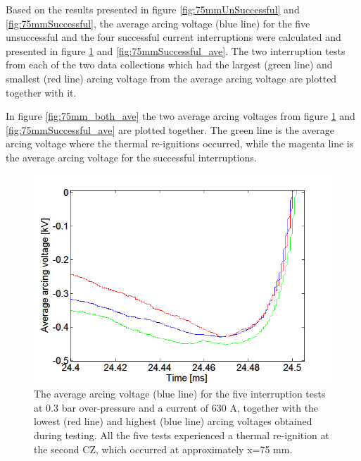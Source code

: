 \documentclass[10pt,b5paper,twoside]{article}
\begin{document}
Based on the results presented in figure \ref{fig:75mmUnSuccessful} and \ref{fig:75mmSuccessful}, the average arcing voltage (blue line) for the five unsuccessful and the four successful current interruptions were calculated and presented in figure \ref{fig:75mmUnSuccessful_ave} and \ref{fig:75mmSuccessful_ave}. The two interruption tests from each of the two data collections which had the largest (green line) and smallest (red line) arcing voltage from the average arcing voltage are plotted together with it.

In figure \ref{fig:75mm_both_ave} the two average arcing voltages from figure \ref{fig:75mmUnSuccessful_ave} and \ref{fig:75mmSuccessful_ave} are plotted together. The green line is the average arcing voltage where the thermal re-ignitions occurred, while the magenta line is the average arcing voltage for the successful interruptions.

\begin{figure}[H]
\centering
\includegraphics[scale=0.6, angle =0 ]{Bilder/Results/ArcingVoltage_75_reIgnition_average.PNG}
\caption{The average arcing voltage (blue line) for the five interruption tests at 0.3 bar over-pressure and a current of 630 A, together with the lowest (red line) and highest (blue line) arcing voltages obtained during testing. All the five tests experienced a thermal re-ignition at the second CZ, which occurred at approximately  x=75 mm.} \label{fig:75mmUnSuccessful_ave}
\end{figure}
\end{document}
